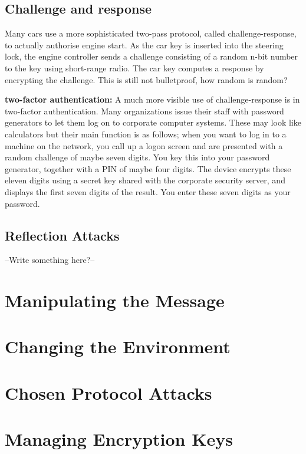 	\clearpage
	\subsection{Challenge and response}

		Many cars use a more sophisticated two-pass protocol, called challenge-response, 
		to actually authorise engine start. As the car key is inserted into the steering lock, 
		the engine controller sends a challenge consisting of a random n-bit number to the key 
		using short-range radio. The car key computes a response by encrypting the challenge. 
		This is still not bulletproof, how random is random?

		{\bf two-factor authentication:} A much more visible use of challenge-response is in two-factor authentication.
		Many organizations issue their staff with password generators to let them
		log on to corporate computer systems. These may look like calculators
		but their main function is as follows; when you want to log in to a machine on the network, 
		you call up a logon screen and are presented with a random challenge of maybe seven digits. 
		You key this into your password generator, together with a PIN of maybe four
		digits. The device encrypts these eleven digits using a secret key shared with
		the corporate security server, and displays the first seven digits of the result.
		You enter these seven digits as your password.

	\subsection{Reflection Attacks}
		--Write something here?--

\clearpage
\section{Manipulating the Message}
	
\section{Changing the Environment}

\section{Chosen Protocol Attacks}

\section{Managing Encryption Keys}

